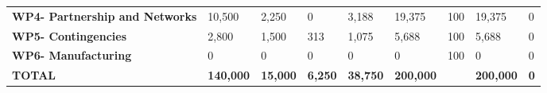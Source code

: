 \begin{table}[H]
{\begin{tabular}{p{5cm}p{2cm}p{2cm}p{2.5cm}p{2cm}p{2cm}p{2cm}p{2cm}p{2cm}}
\textbf{WP4- Partnership and Networks} & 10,500                                                                          & 2,250                                                                       &0                                                                                          & 3,188                                                                   & 19,375                                                                                  & 100                                                                                & 19,375                            & 0                                                                                  \\
\textbf{WP5- Contingencies}                                                        & 2,800                                                                           & 1,500                                                                       & 313                                                                                      & 1,075                                                                   & 5,688                                                                                   & 100                                                                                & 5,688                             & 0                                                                                  \\
\textbf{WP6- Manufacturing}                                                        & 0                                                                               & 0                                                                           &0                                                                                          & 0                                                                       & 0                                                                                       & 100                                                                                & 0                                 & 0                                                                                  \\ \hline
\textbf{TOTAL}                                                                     & \textbf{140,000}                                                                & \textbf{15,000}                                                             & \textbf{6,250}                                                                           & \textbf{38,750}                                                         & \textbf{200,000}                                                                        & \textbf{}                                                                        & \textbf{200,000}                  & \textbf{0}                                                                         \\ \bottomrule[2pt]
\end{tabular} }
\end{table}



